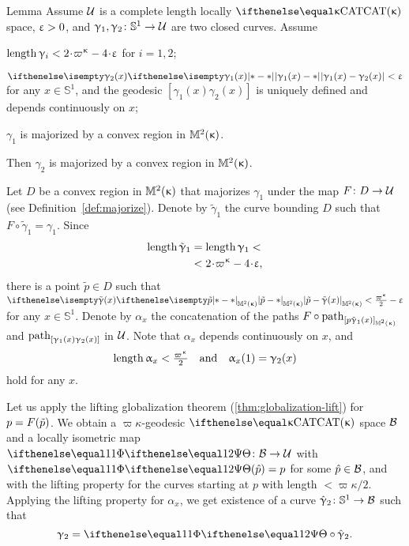 \begin{thm}{Lemma}
Assume $\mathcal{U}$ is a complete length  locally $\CAT\kappa$ space,
$\upvarepsilon>0$,
and $\gamma_1,\gamma_2\:\mathbb{S}^1\to\spc{U}$ are two closed curves.
Assume 
\begin{subthm}{}
$\length\gamma_i<2\cdot\varpi\kappa-4\cdot\eps$ for $i=1,2$;
\end{subthm}
 
\begin{subthm}{} $\dist{\gamma_1(x)}{\gamma_2(x)}{}<\eps$ for any $x\in\mathbb{S}^1$, and the geodesic $[\gamma_1(x)\gamma_2(x)]$ is uniquely defined and depends continuously on $x$;
\end{subthm}

\begin{subthm}{}  $\gamma_1$ is majorized by a convex region in $\mathbb{M}_{{}}^{2}({\upkappa})$.
\end{subthm}

Then  $\gamma_2$ is majorized by a convex region in $\mathbb{M}_{{}}^{2}({\upkappa})$.
\end{thm}

 Let $D$ be a convex region in $\mathbb{M}_{{}}^{2}({\upkappa})$ that majorizes $\gamma_1$ under the map $F\:D\to\spc{U}$ 
(see Definition~\ref{def:majorize}).
Denote by $\tilde \gamma_1$ 
the curve bounding $D$ 
such that $F\circ\tilde \gamma_1=\gamma_1$.
Since  
\begin{align*}
\length\tilde \gamma_1
&=
\length\gamma_1
<
\\
&<
2\cdot\varpi\kappa-4\cdot\eps,
\end{align*}
there is a point $\tilde p\in D$ such that 
$\dist{\tilde p}{\tilde \gamma(x)}{\Lob2\kappa}<\tfrac{\varpi\kappa}2-\eps$
for any $x\in\mathbb{S}^1$.
Denote by $\alpha_x$ the concatenation of the paths $F\circ\geodpath_{[p\tilde \gamma_1(x)]_{\Lob2\kappa}}$ 
and  $\mathrm{path}_{[\upgamma_1(x)\upgamma_2(x)]}$ in $\mathcal{U}$.
Note that $\alpha_x$ depends continuously on $x$, and
$$\length\alpha_x<\tfrac{\varpi\kappa}{2}\quad \text{and}\quad \alpha_x(1)=\gamma_2(x)$$ 
hold for any $x$.

Let us apply the lifting globalization theorem (\ref{thm:globalization-lift}) for $p\z=F(\tilde p)$.
We obtain a $\varpi\kappa$-geodesic $\CAT\kappa$ space $\mathcal{B}$
and a locally isometric map $\map\:\spc{B}\to\spc{U}$
with $\map(\hat p)=p$ for some $\hat p \in \spc{B}$, and with the lifting property for the curves starting at $p$ with length $<\varpi\kappa/2$.
Applying the lifting property for $\alpha_x$, 
we get existence of a curve $\hat\gamma_2\:\mathbb{S}^1\to \spc{B}$ such that
$$\gamma_2=\map\circ\hat\gamma_2.$$

